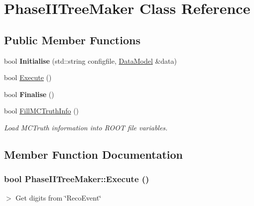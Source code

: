 \hypertarget{classPhaseIITreeMaker}{
\section{PhaseIITreeMaker Class Reference}
\label{classPhaseIITreeMaker}
}
\subsection*{Public Member Functions}
\begin{DoxyCompactItemize}
\item 
\hypertarget{classPhaseIITreeMaker_a531b4be5f95cab025fd311d3a3ed6c1e}{
bool {\bfseries Initialise} (std::string configfile, \hyperlink{classDataModel}{DataModel} \&data)}
\label{classPhaseIITreeMaker_a531b4be5f95cab025fd311d3a3ed6c1e}

\item 
bool \hyperlink{classPhaseIITreeMaker_ae599e4fbd5455b5e6e1b747367b27627}{Execute} ()
\item 
\hypertarget{classPhaseIITreeMaker_a18740e2ffa64127a8642257bd8da9184}{
bool {\bfseries Finalise} ()}
\label{classPhaseIITreeMaker_a18740e2ffa64127a8642257bd8da9184}

\item 
bool \hyperlink{classPhaseIITreeMaker_ac2d2d03c44f7abcafce90ea1c0f2b935}{FillMCTruthInfo} ()
\begin{DoxyCompactList}\small\item\em Load MCTruth information into ROOT file variables. \item\end{DoxyCompactList}\end{DoxyCompactItemize}


\subsection{Member Function Documentation}
\hypertarget{classPhaseIITreeMaker_ae599e4fbd5455b5e6e1b747367b27627}{
\subsubsection[{Execute}]{\setlength{\rightskip}{0pt plus 5cm}bool PhaseIITreeMaker::Execute ()}}
\label{classPhaseIITreeMaker_ae599e4fbd5455b5e6e1b747367b27627}


$>$ Get digits from \char`\"{}RecoEvent\char`\"{}

